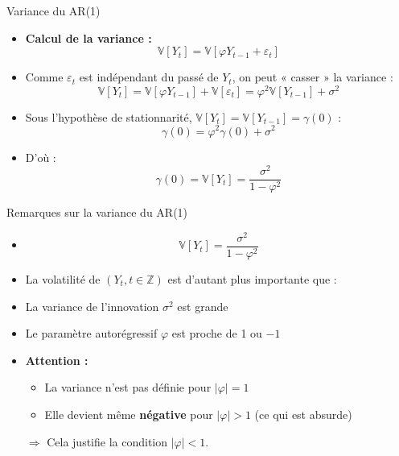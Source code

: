 \documentclass[11pt,aspectratio=169]{beamer}
\newcommand{\Var}{\mathbb{V}}
\newcommand{\Z}{\mathbb{Z}}
\begin{document}
\begin{frame}{Variance du AR(1)}

\begin{itemize}

\item \textbf{Calcul de la variance :}
\[
\Var[Y_t] = \Var[\varphi Y_{t-1} + \varepsilon_t]
\]

\item Comme $\varepsilon_t$ est indépendant du passé de $Y_t$, on peut « casser » la variance :
\[
\Var[Y_t] = \Var[\varphi Y_{t-1}] + \Var[\varepsilon_t] = \varphi^2 \Var[Y_{t-1}] + \sigma^2
\]

\item Sous l'hypothèse de stationnarité, $\Var[Y_t] = \Var[Y_{t-1}] = \gamma(0)$ :
\[
\gamma(0) = \varphi^2 \gamma(0) + \sigma^2
\]

\item D'où :
\[
\boxed{\gamma(0) = \Var[Y_t] = \frac{\sigma^2}{1 - \varphi^2}}
\]

\end{itemize}
\end{frame}

\begin{frame}{Remarques sur la variance du AR(1)}

\begin{itemize}

\item \[
\Var[Y_t] = \frac{\sigma^2}{1 - \varphi^2}
\]

\item La volatilité de $(Y_t, t \in \Z)$ est d'autant plus importante que :\newline

\item La variance de l'innovation $\sigma^2$ est grande\newline

\item Le paramètre autorégressif $\varphi$ est proche de 1 ou $-1$\newline

\item \textbf{Attention :}
\begin{itemize}
\item La variance n'est pas définie pour $|\varphi| = 1$
\item Elle devient même \textbf{négative} pour $|\varphi| > 1$ (ce qui est absurde)
\end{itemize}
$\Rightarrow$ Cela justifie la condition $|\varphi| < 1$.

\end{itemize}
\end{frame}
\end{document}
